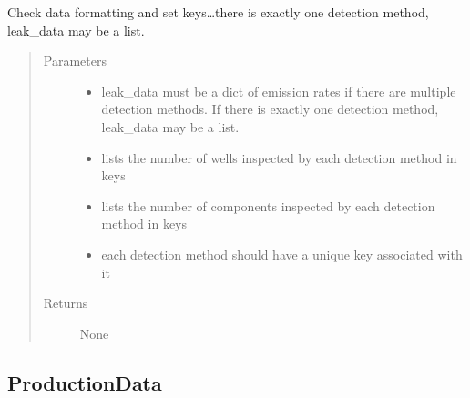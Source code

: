 \documentclass[letterpaper,10pt,english]{sphinxmanual}
\begin{document}
\begin{fulllineitems}
\begin{fulllineitems}
\label{\detokenize{index:feast.input_data_classes.LeakData.define_data}}
Check data formatting and set keys…there is exactly one detection method, leak\_data may be a list.
\begin{quote}\begin{description}
\item[{Parameters}] \leavevmode\begin{itemize}
\item {} 
 \textendash{} leak\_data must be a dict of emission rates if there are multiple detection methods. If
there is exactly one detection method, leak\_data may be a list.

\item {} 
 \textendash{} lists the number of wells inspected by each detection method in keys

\item {} 
 \textendash{} lists the number of components inspected by each detection method in keys

\item {} 
 \textendash{} each detection method should have a unique key associated with it

\end{itemize}

\item[{Returns}] \leavevmode
None

\end{description}\end{quote}

\end{fulllineitems}


\end{fulllineitems}



\subsection{ProductionData}
\label{\detokenize{index:productiondata}}
\end{document}
